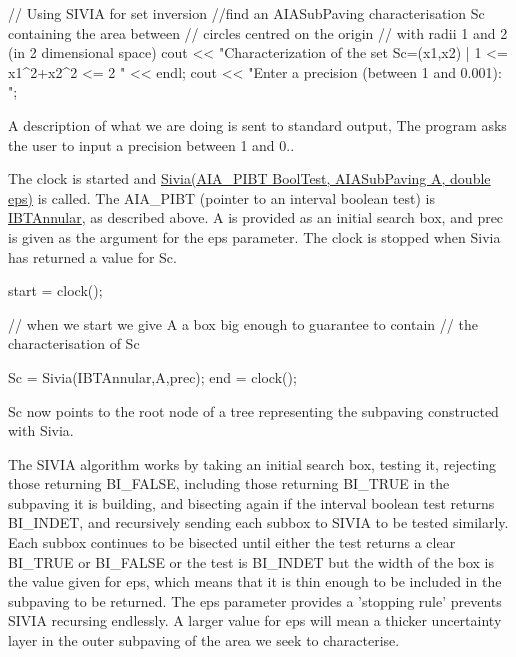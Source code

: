 \begin{DoxyCodeInclude}
  // Using SIVIA for set inversion
  //find an AIASubPaving characterisation Sc containing the area between 
  // circles centred on the origin
  // with radii 1 and 2 (in 2 dimensional space)
  cout << "Characterization of the set Sc={(x1,x2) | 1 <= x1^2+x2^2 <= 2 }" 
       << endl;
  cout << "Enter a precision (between 1 and 0.001): ";

\end{DoxyCodeInclude}


\-A description of what we are doing is sent to standard output, \-The program asks the user to input a precision between 1 and 0..

\-The clock is started and \hyperlink{AIAsubpaving_8cpp_a9bc7ba1f54979fabaf0f0ffeab245234}{\-Sivia(\-A\-I\-A\-\_\-\-P\-I\-B\-T Bool\-Test, A\-I\-A\-Sub\-Paving A, double eps)} is called. \-The \-A\-I\-A\-\_\-\-P\-I\-B\-T (pointer to an interval boolean test) is \hyperlink{AIASubPavings_IBTAnnular}{\-I\-B\-T\-Annular}, as described above. \-A is provided as an initial search box, and prec is given as the argument for the eps parameter. \-The clock is stopped when \-Sivia has returned a value for \-Sc.


\begin{DoxyCodeInclude}
  start = clock();

  // when we start we give A a box big enough to guarantee to contain 
  // the characterisation of Sc

  Sc = Sivia(IBTAnnular,A,prec);
  end = clock();

\end{DoxyCodeInclude}


\-Sc now points to the root node of a tree representing the subpaving constructed with \-Sivia.

\-The \-S\-I\-V\-I\-A algorithm works by taking an initial search box, testing it, rejecting those returning \-B\-I\-\_\-\-F\-A\-L\-S\-E, including those returning \-B\-I\-\_\-\-T\-R\-U\-E in the subpaving it is building, and bisecting again if the interval boolean test returns \-B\-I\-\_\-\-I\-N\-D\-E\-T, and recursively sending each subbox to \-S\-I\-V\-I\-A to be tested similarly. \-Each subbox continues to be bisected until either the test returns a clear \-B\-I\-\_\-\-T\-R\-U\-E or \-B\-I\-\_\-\-F\-A\-L\-S\-E or the test is \-B\-I\-\_\-\-I\-N\-D\-E\-T but the width of the box is the value given for eps, which means that it is thin enough to be included in the subpaving to be returned. \-The eps parameter provides a 'stopping rule' prevents \-S\-I\-V\-I\-A recursing endlessly. \-A larger value for eps will mean a thicker uncertainty layer in the outer subpaving of the area we seek to characterise.

